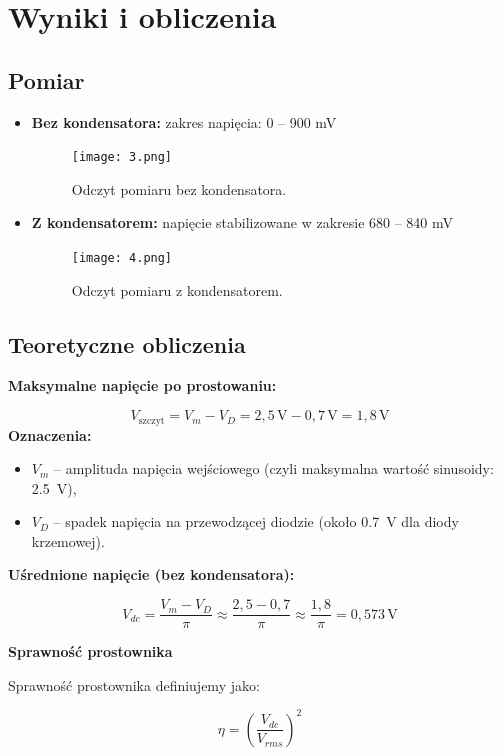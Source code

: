 \documentclass[a4paper,12pt]{article}
\begin{document}
\section*{Wyniki i obliczenia}

\subsection*{Pomiar}


\begin{itemize}
    \item \textbf{Bez kondensatora:} zakres napięcia: 0 -- 900 mV
    \begin{figure}[h]
\centering
\texttt{[image: 3.png]}
\caption{Odczyt pomiaru bez kondensatora.}
\label{fig:schemat}
\end{figure}
    \item \textbf{Z kondensatorem:} napięcie stabilizowane w zakresie 680 -- 840 mV
    \begin{figure}[H]
\centering
\texttt{[image: 4.png]}
\caption{Odczyt pomiaru z kondensatorem.}
\label{fig:schemat}
\end{figure}
\end{itemize}

\subsection*{Teoretyczne obliczenia}

\textbf{Maksymalne napięcie po prostowaniu:}

\[
V_{\text{szczyt}} = V_m - V_D = 2{,}5\,\text{V} - 0{,}7\,\text{V} = 1{,}8\,\text{V}
\]
\textbf{Oznaczenia:}

\begin{itemize}
    \item $V_m$ – amplituda napięcia wejściowego (czyli maksymalna wartość sinusoidy: \SI{2.5}{\volt}),
    \item $V_D$ – spadek napięcia na przewodzącej diodzie (około \SI{0.7}{\volt} dla diody krzemowej).
\end{itemize}

\textbf{Uśrednione napięcie (bez kondensatora):}

\[
V_{dc} = \frac{V_m- V_D}{\pi}  \approx \frac{2{,}5- 0{,}7}{\pi}  \approx \frac{1{,}8}{\pi} = 0{,}573\,\text{V}
\]


\textbf{Sprawność prostownika}

Sprawność prostownika definiujemy jako:

\[
\eta = \left( \frac{V_{dc}}{V_{rms}} \right)^2
\]
\end{document}

